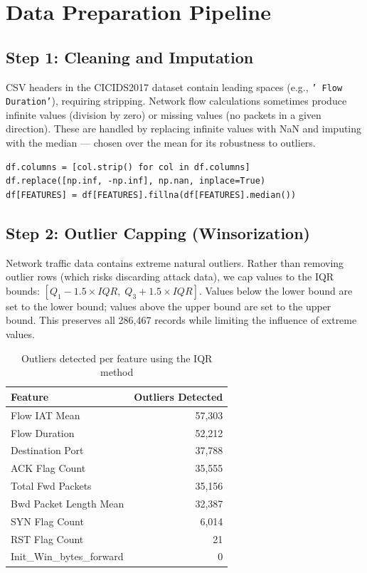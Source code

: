 \documentclass[12pt,a4paper]{report}
\begin{document}
\section{Data Preparation Pipeline}\label{sec:prep_pipeline}

\subsection{Step 1: Cleaning and Imputation}

CSV headers in the CICIDS2017 dataset contain leading spaces (e.g., \texttt{' Flow Duration'}), requiring stripping. Network flow calculations sometimes produce infinite values (division by zero) or missing values (no packets in a given direction). These are handled by replacing infinite values with NaN and imputing with the median --- chosen over the mean for its robustness to outliers.

\begin{lstlisting}[caption={Handling missing and infinite values}]
df.columns = [col.strip() for col in df.columns]
df.replace([np.inf, -np.inf], np.nan, inplace=True)
df[FEATURES] = df[FEATURES].fillna(df[FEATURES].median())
\end{lstlisting}

\subsection{Step 2: Outlier Capping (Winsorization)}

Network traffic data contains extreme natural outliers. Rather than removing outlier rows (which risks discarding attack data), we cap values to the IQR bounds: $[Q_1 - 1.5 \times IQR,\; Q_3 + 1.5 \times IQR]$. Values below the lower bound are set to the lower bound; values above the upper bound are set to the upper bound. This preserves all 286,467 records while limiting the influence of extreme values.

\begin{table}[H]
\centering
\caption{Outliers detected per feature using the IQR method}
\label{tab:outliers}
\begin{tabular}{lr}
\toprule
\textbf{Feature} & \textbf{Outliers Detected} \\
\midrule
Flow IAT Mean & 57,303 \\
Flow Duration & 52,212 \\
Destination Port & 37,788 \\
ACK Flag Count & 35,555 \\
Total Fwd Packets & 35,156 \\
Bwd Packet Length Mean & 32,387 \\
SYN Flag Count & 6,014 \\
RST Flag Count & 21 \\
Init\_Win\_bytes\_forward & 0 \\
\bottomrule
\end{tabular}
\end{table}
\end{document}
